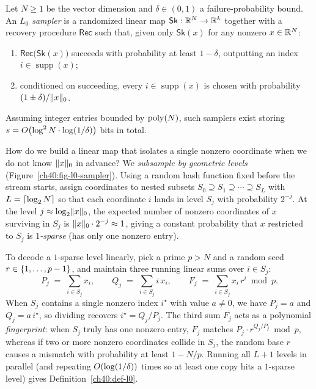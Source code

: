 \begin{definition}[$L_0$ sampler]\label{ch40:def-l0}
Let $N \ge 1$ be the vector dimension and $\delta \in (0,1)$ a failure-probability
bound. An \emph{$L_0$ sampler} is a randomized linear map
$\mathsf{Sk}:\mathbb{R}^N\to\mathbb{R}^k$ together with a recovery procedure $\mathsf{Rec}$
such that, given only $\mathsf{Sk}(x)$ for any nonzero $x\in\mathbb{R}^N$:
\begin{enumerate}
\item $\mathsf{Rec}\bigl(\mathsf{Sk}(x)\bigr)$ succeeds with probability at
least $1-\delta$, outputting an index $i\in\operatorname{supp}(x)$;
\item conditioned on succeeding, every $i\in\operatorname{supp}(x)$ is chosen
with probability $(1\pm\delta)/\lVert x\rVert_0$.
\end{enumerate}
Assuming integer entries bounded by $\operatorname{poly}(N)$, such samplers exist storing
$s = O\bigl(\log^2 N \cdot \log(1/\delta)\bigr)$ bits in total.
\end{definition}

How do we build a linear map that isolates a single nonzero coordinate when we
do not know $\lVert x\rVert_0$ in advance? We \emph{subsample by geometric levels}
(Figure~\ref{ch40:fig-l0-sampler}). Using a random hash function fixed before
the stream starts, assign coordinates to nested subsets
$S_0 \supseteq S_1 \supseteq \cdots \supseteq S_L$ with $L = \lceil\log_2 N\rceil$ so
that each coordinate $i$ lands in level $S_j$ with probability $2^{-j}$. At the
level $j \approx \log_2 \lVert x\rVert_0$, the expected number of nonzero coordinates
of $x$ surviving in $S_j$ is $\lVert x\rVert_0 \cdot 2^{-j} \approx 1$, giving a
constant probability that $x$ restricted to $S_j$ is \emph{$1$-sparse} (has
only one nonzero entry).

To decode a $1$-sparse level linearly, pick a prime $p > N$ and a random seed
$r \in \{1,\dots,p-1\}$, and maintain three running linear sums over
$i\in S_j$:
\[
  P_j \;=\; \sum_{i\in S_j} x_i,
  \qquad
  Q_j \;=\; \sum_{i\in S_j} i\,x_i,
  \qquad
  F_j \;=\; \sum_{i\in S_j} x_i\, r^i \bmod p.
\]
When $S_j$ contains a single nonzero index $i^\star$ with value $a \neq 0$, we
have $P_j = a$ and $Q_j = a\,i^\star$, so dividing recovers
$i^\star = Q_j / P_j$. The third sum $F_j$ acts as a polynomial
\emph{fingerprint}: when $S_j$ truly has one nonzero entry, $F_j$ matches
$P_j \cdot r^{Q_j/P_j} \bmod p$, whereas if two or more nonzero coordinates
collide in $S_j$, the random base $r$ causes a mismatch with probability at
least $1 - N/p$. Running all $L+1$ levels in parallel (and repeating
$O(\log(1/\delta))$ times so at least one copy hits a $1$-sparse level) gives
Definition~\ref{ch40:def-l0}.


